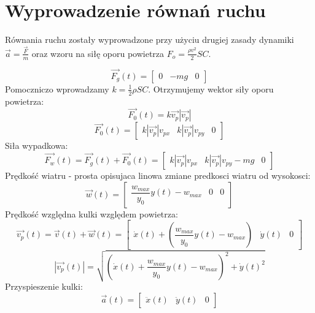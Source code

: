 \documentclass[12pt,a4paper]{article}
\begin{document}
\section{Wyprowadzenie równań ruchu}
Równania ruchu zostały wyprowadzone przy użyciu drugiej zasady dynamiki $\vec{a} = \frac{\vec{F}}{m}$ oraz wzoru na siłę oporu powietrza $F_o = \frac{\rho v^2}{2} S C$.

\begin{equation}
    \vec{F_g}(t) = 
    \begin{bmatrix}
        0 & -mg & 0
    \end{bmatrix}
\end{equation}
Pomoczniczo wprowadzamy $k = \frac{1}{2}\rho S C$. Otrzymujemy wektor siły oporu powietrza:
\begin{equation}
    \vec{F_0}(t) = k \vec{v_p} |\vec{v_p}|
\end{equation}
\begin{equation}
    \vec{F_0}(t) = 
    \begin{bmatrix}
        k |\vec{v_p}| v_{px} & k |\vec{v_p}| v_{py} & 0
    \end{bmatrix}
\end{equation}
Siła wypadkowa:
\begin{equation}
    \vec{F_w}(t) = \vec{F_g}(t) + \vec{F_0}(t) = 
    \begin{bmatrix}
        k |\vec{v_{p}}| v_{px} & k |\vec{v_{p}}| v_{py} - mg & 0
    \end{bmatrix}
\end{equation}
Prędkość wiatru - prosta opisujaca linowa zmiane predkosci wiatru od wysokosci:
\begin{equation}
    \vec{w}(t) = 
    \begin{bmatrix}
        \dfrac{w_{max}}{y_0} y(t) - w_{max} & 0 & 0
    \end{bmatrix}
\end{equation}
Prędkość względna kulki względem powietrza:
\begin{equation}
    \vec{v_p}(t) = \vec{v}(t) + \vec{w}(t) =
    \begin{bmatrix}
        \dot{x}(t) + \left( \dfrac{w_{max}}{y_0} y(t) - w_{max} \right) & \dot{y}(t) & 0
    \end{bmatrix}
\end{equation}
\begin{equation}
    |\vec{v_p}(t)| = \sqrt{\left( \dot{x}(t) + \dfrac{w_{max}}{y_0} y(t) - w_{max} \right)^2 + \dot{y}(t)^2}
\end{equation}
Przyspieszenie kulki:
\begin{equation}
    \vec{a}(t)  = 
    \begin{bmatrix}
        \ddot{x}(t)  & \ddot{y}(t)  & 0
    \end{bmatrix}
    \label{eq:acc_vector}
\end{equation}
\end{document}
